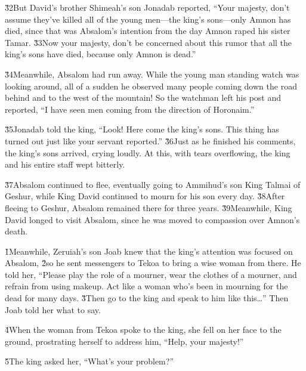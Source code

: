 \v{32}But David's brother Shimeah's son Jonadab reported, ``Your majesty, don't assume they've killed all of the young men---the king's sons---only Amnon has died, since that was Absalom's intention from the day Amnon raped his sister Tamar. \v{33}Now your majesty, don't be concerned about this rumor that all the king's sons have died, because only Amnon is dead.''

\v{34}Meanwhile, Absalom had run away. While the young man standing watch was looking around, all of a sudden he observed many people coming down the road behind and to the west of the mountain! So the watchman left his post and reported, ``I have seen men coming from the direction of Horonaim.''

\v{35}Jonadab told the king, ``Look! Here come the king's sons. This thing has turned out just like your servant reported.'' \v{36}Just as he finished his comments, the king's sons arrived, crying loudly. At this, with tears overflowing, the king and his entire staff wept bitterly.

\v{37}Absalom continued to flee, eventually going to Ammihud's son King Talmai of Geshur, while King David continued to mourn for his son every day. \v{38}After fleeing to Geshur, Absalom remained there for three years. \v{39}Meanwhile, King David longed to visit Absalom, since he was moved to compassion over Amnon's death.

\v{1}Meanwhile, Zeruiah's son Joab knew that the king's attention was focused on Absalom, \v{2}so he sent messengers to Tekoa to bring a wise woman from there. He told her, ``Please play the role of a mourner, wear the clothes of a mourner, and refrain from using makeup. Act like a woman who's been in mourning for the dead for many days. \v{3}Then go to the king and speak to him like this{\ldots}'' Then Joab told her what to say.

\v{4}When the woman from Tekoa spoke to the king, she fell on her face to the ground, prostrating herself to address him, ``Help, your majesty!''

\v{5}The king asked her, ``What's your problem?''

